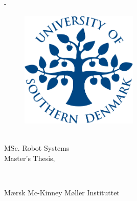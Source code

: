\begin{titlingpage}
	\thispagestyle{empty}
	\enlargethispage{1.3cm}
	\calccentering{\unitlength}
	\begin{adjustwidth}{\unitlength}{-\unitlength}
		\vspace*{-1.9cm}
		\begin{figure} %
			\centering
			\includegraphics[width=0.5\textwidth]{figures/front_matter/SDU2013_SDU_Logo}
		\end{figure}

		\begin{raggedright}
			\begin{Spacing}{1.2}
				{\sffamily\HUGE\textbf{\ThTitleEN}\\[1cm]}
				{\sffamily\LARGE{MSc. Robot Systems}\\[1cm]}
				{\sffamily\LARGE{Master's Thesis, \ThEndDate}\\[1cm]}
			\end{Spacing}
			{\LARGE\sffamily\ThAuthors\\[2cm]}
		\end{raggedright}
		\begin{raggedright}
			\sffamily\LARGE{Mærsk Mc-Kinney Møller Instituttet}
		\end{raggedright}
	\end{adjustwidth}


\end{titlingpage}
